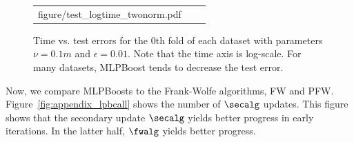 \begin{figure}[p]
\begin{tabular}{ccc}
\begin{minipage}[t]{0.31\hsize}
            {figure/test_logtime_twonorm.pdf}
        \end{minipage}
    \end{tabular}
    \caption{%
        Time vs. test errors for the 0th fold of each dataset %
        with parameters $\nu = 0.1m$ and $\epsilon = 0.01$. %
        Note that the time axis is log-scale. %
        For many datasets, MLPBoost tends to decrease %
        the test error. %
    }
    \label{fig:appendix_test_errors}
\end{figure}

Now, we compare MLPBoosts to the Frank-Wolfe algorithms, FW and PFW. 
Figure~\ref{fig:appendix_lpbcall} shows 
the number of $\secalg$ updates. 
This figure shows that 
the secondary update $\secalg$ yields better progress 
in early iterations. In the latter half, 
$\fwalg$ yields better progress. 
